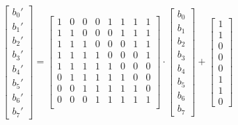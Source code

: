 \documentclass[10pt,a4paper,twoside]{llncs}
\begin{document}
\begin{equation}
 \left[
  \begin{array}{c}
    b_{0}'\\b_{1}'\\b_{2}'\\b_{3}'\\b_{4}'\\b_{5}'\\b_{6}'\\b_{7}'
  \end{array}
 \right]=\left[
  \begin{array}{cccccccc}
    1&0&0&0&1&1&1&1\\
    1&1&0&0&0&1&1&1\\
    1&1&1&0&0&0&1&1\\
    1&1&1&1&0&0&0&1\\
    1&1&1&1&1&0&0&0\\
    0&1&1&1&1&1&0&0\\
    0&0&1&1&1&1&1&0\\
    0&0&0&1&1&1&1&1\\
  \end{array}
 \right]\cdot\left[
  \begin{array}{c}
    b_{0}\\b_{1}\\b_{2}\\b_{3}\\b_{4}\\b_{5}\\b_{6}\\b_{7}
  \end{array}
 \right]+\left[
  \begin{array}{c}
    1\\1\\0\\0\\0\\1\\1\\0
  \end{array}
 \right]
\end{equation}

\end{document}
